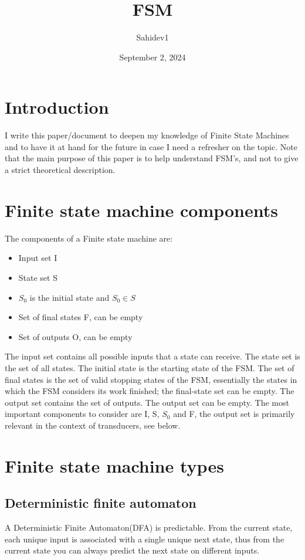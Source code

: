 \documentclass[a4paper,11pt]{article}
\title{
    \textbf{FSM}
}
\author{Sahidev1}
\date{September 2, 2024}
\begin{document}
\maketitle

\section*{Introduction}
I write this paper/document to deepen my knowledge of Finite State Machines and to have it at hand for the future in case I need a refresher on the topic. Note that the main purpose of this paper is to help understand FSM's, and not to give a strict theoretical description. 

\section*{Finite state machine components}
The components of a Finite state machine are:
\begin{itemize}
    \item Input set I
    \item State set S
    \item $S_0$ is the initial state and $S_0 \in S$
    \item Set of final states F, can be empty
    \item Set of outputs O, can be empty
\end{itemize}


The input set contains all possible inputs that a state can receive. The state set is the set of all states. The initial state is the starting state of the FSM. The set of final states is the set of valid stopping states of the FSM, essentially the states in which the FSM considers its work finished; the final-state set can be empty. The output set contains the set of outputs. The output set can be empty. The most important components to consider are I, S, $S_0$ and F, the output set is primarily relevant in the context of transducers, see below. 


\section*{Finite state machine types}
\subsection*{Deterministic finite automaton}
A Deterministic Finite Automaton(DFA) is predictable. From the current state, each unique input is associated with a single unique next state, thus from the current state you can always predict the next state on different inputs. 
\end{document}
